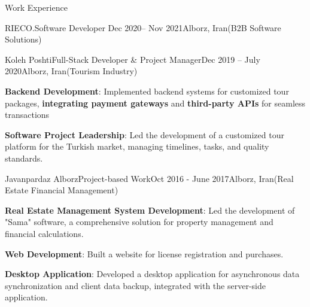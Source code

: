 \documentclass[]{kyvernitis-resume}
\begin{document}
\begin{section}{Work Experience}
\begin{subsection}{RIECO.}{Software Developer }{Dec 2020-- Nov 2021}{Alborz, Iran}{(B2B Software Solutions)}
    \end{subsection}
    
    \begin{subsection}{Koleh Poshti}{Full-Stack Developer \& Project Manager}{Dec 2019 -- July 2020}{Alborz, Iran}{(Tourism Industry)}

	\item \textbf{Backend Development}: Implemented backend systems for customized tour packages, \textbf{integrating payment gateways} and \textbf{third-party APIs} for seamless transactions
        	\item \textbf{Software Project Leadership}: Led the development of a customized tour platform for the Turkish market, managing timelines, tasks, and quality standards.

    \end{subsection}


    \begin{subsection}{Javanpardaz Alborz}{Project-based Work}{Oct 2016 - June 2017}{Alborz, Iran}{(Real Estate Financial Management)}
	\item \textbf{Real Estate Management System Development}: Led the development of "Sama" software, a comprehensive solution for property management and financial calculations.
	\item \textbf{Web Development}: Built a 
website for license registration and purchases.
	\item \textbf{Desktop Application}: Developed a 
desktop application for asynchronous data synchronization and client data backup, integrated with the server-side application.


\end{subsection}
\end{section}
\end{document}

